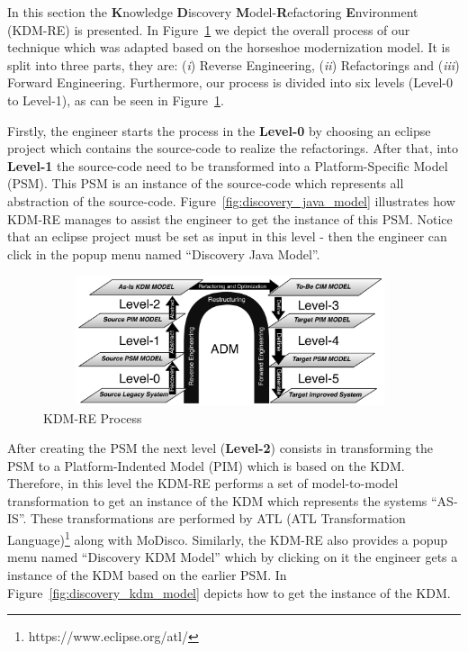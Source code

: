 In this section the \textbf{K}nowledge \textbf{D}iscovery \textbf{M}odel-\textbf{R}efactoring \textbf{E}nvironment (KDM-RE) is presented. 
In Figure~\ref{fig:process} we depict the overall process of our technique which was adapted based on the horseshoe modernization model. 
It is split into three parts, they are: 
(\textit{i}) Reverse Engineering, 
(\textit{ii}) Refactorings and 
(\textit{iii}) Forward Engineering. 
Furthermore, our process is divided into six levels (Level-0 to Level-1), as can be seen in Figure~\ref{fig:process}. 

Firstly, the engineer starts the process in the \textbf{Level-0} by choosing an eclipse project which contains the source-code to realize the refactorings.  
After that, into \textbf{Level-1} the source-code need to be transformed into a Platform-Specific Model (PSM). 
This PSM is an instance of the source-code which represents all abstraction of the source-code. 
Figure~\ref{fig:discovery_java_model} illustrates how KDM-RE manages to assist the engineer to get the instance of this PSM. 
Notice that an eclipse project must be set as input in this level - then the engineer can click in the popup menu named ``Discovery Java Model''.

\begin{figure}[!ht]
\centering
  \includegraphics[width=11cm, height=3.8cm]{figure/processoDaFerramenta}
\caption{KDM-RE Process}
\label{fig:process}
\end{figure} 

After creating the PSM the next level (\textbf{Level-2}) consists in transforming the PSM to a Platform-Indented Model (PIM) which is based on the KDM. 
Therefore, in this level the KDM-RE performs a set of model-to-model transformation to get an instance of the KDM which represents the systems ``AS-IS''. 
These transformations are performed by ATL (ATL Transformation Language)\footnote{https://www.eclipse.org/atl/} along with MoDisco.
Similarly, the KDM-RE also provides a popup menu named ``Discovery KDM Model'' which by clicking on it the engineer gets a instance of the KDM based on the earlier PSM.
In Figure~\ref{fig:discovery_kdm_model} depicts how to get the instance of the KDM.

